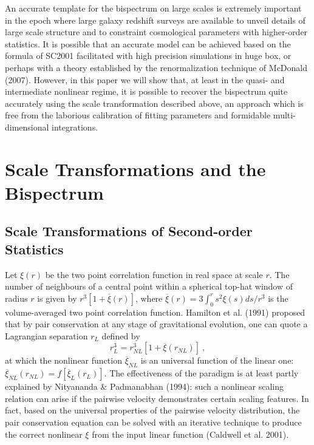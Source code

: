 \documentclass[]{mn2e}
\begin{document}
An accurate template for the bispectrum on large scales is extremely
important in the epoch where large galaxy redshift surveys are
available to unveil details of large scale structure and to
constraint cosmological parameters with higher-order statistics. It
is possible that an accurate model can be achieved based on the
formula of SC2001 facilitated with high precision simulations in
huge box, or perhaps with a theory  established by the
renormalization technique of McDonald (2007). However, in this paper
we will show that, at least in the quasi- and intermediate nonlinear
regime, it is possible to recover the bispectrum quite accurately
using the scale transformation described above, an approach which is
free from the laborious calibration of fitting parameters and
formidable multi-dimensional integrations.


\section{Scale Transformations and the Bispectrum}

\subsection{Scale Transformations of Second-order Statistics}
Let $\xi(r)$ be the two point correlation function in real space at
scale $r$. The number of neighbours of a central point within a
spherical top-hat window of radius $r$ is given by
$r^3[1+\overline{\xi}(r)]$, where $\overline{\xi}(r)=3\int_0^r
s^2\xi(s)ds/r^3$ is the volume-averaged two point correlation
function. Hamilton et al. (1991) proposed that by pair conservation
at any stage of gravitational evolution, one can quote a Lagrangian
separation $r_L$ defined by
\begin{equation}
r_L^3=r_{NL}^3\left[ 1+\overline{\xi}(r_{NL}) \right]\ ,
\end{equation}
at which the nonlinear function $\overline{\xi}_{NL}$ is an
universal function of the linear one:
$\overline{\xi}_{NL}(r_{NL})=f[\overline{\xi}_L(r_L)]$. The
effectiveness of the paradigm is at least partly explained by
Nityananda \& Padmanabhan (1994): such a nonlinear scaling relation
can arise if the pairwise velocity demonstrates certain scaling
features. In fact, based on the universal properties of the pairwise
velocity distribution, the pair conservation equation can be solved
with an iterative technique to produce the correct nonlinear $\xi$
from the input linear function (Caldwell et al. 2001).
\end{document}
